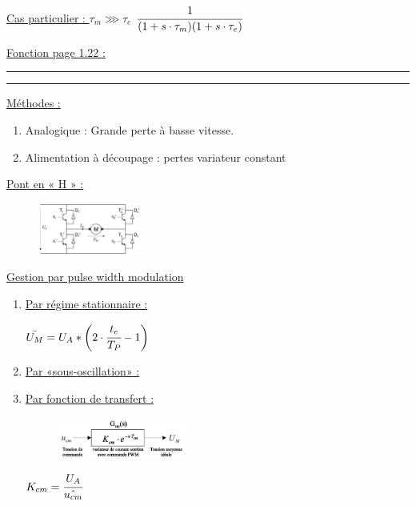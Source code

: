 \documentclass[	DIV=calc,%
							paper=a4,%
							fontsize=10pt,%
							twocolumn]{scrartcl} %
\newcommand{\hformbar}[1]{\bigskip \hrule \vspace{1pt} \hrule \vspace{5pt}} %
\newcounter{mycounter}
\newcommand{\formdesc}[1]{\large\textbf{#1} \addtocounter{mycounter}{1} \hfill \themycounter \\ \vspace{-3mm} \hrule \vspace{2mm}}
\newcommand{\formtitle}[1]{\large\underline{#1}}
\begin{document}
\vspace{3mm}
\formtitle{Cas particulier : $\tau_m \ggg \tau_e $}
{\hfill $ \cfrac{1}{(1+s\cdot \tau_{m})(1+s\cdot \tau_{e})}$\hfill}


\formtitle{Fonction page 1.22 :}

\hformbar


\formdesc{Alimentations des moteurs DC}

\formtitle{Méthodes :}

\begin{enumerate}
    \item Analogique : Grande perte à basse vitesse. 
    \item Alimentation à découpage : pertes variateur constant
\end{enumerate}

\formtitle{Pont en « H » :}

\begin{figure}[H]
    \begin{center}      
        \includegraphics[width = 0.3\textwidth]{img/Pont_H.JPG}
    \end{center}
\end{figure}
\formtitle{Gestion par pulse width modulation}

\begin{enumerate}
    \item \formtitle{Par régime stationnaire : }

{\hfill $ \bar{U_{M}} = U_A * \biggl(2 \cdot \cfrac{t_e}{T_P} -1 \biggr)$\hfill}

\item \formtitle{Par «sous-oscillation» : }

\item \formtitle{Par fonction de transfert : }

    \begin{figure}[H]
        \begin{center}      
            \includegraphics[width = 0.4\textwidth]{img/PWM_FT.JPG}
        \end{center}
    \end{figure}

    {\hfill $ K_{cm} = \cfrac{U_A}{\hat{u_{cm}}}$\hfill}

\end{enumerate}
\end{document}
